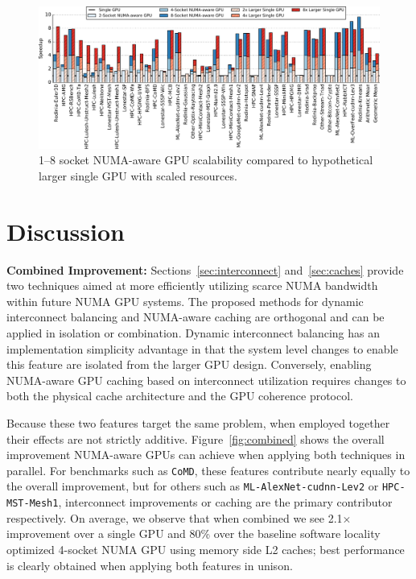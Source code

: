 \begin{figure}[t]
    \centering
    \includegraphics[width=1.0\textwidth]{figures/plot_scalability_mgpu_WB.pdf}
    \vspace{-0.05in}
    \caption{1--8 socket NUMA-aware GPU scalability compared to hypothetical larger single GPU with scaled resources.}
    \label{fig:scalability}
    \vspace{-.2in}
\end{figure}

\vspace{-0.15in}
\section {Discussion}
\label{sec:discussion}
\textbf{Combined Improvement:} Sections~\ref{sec:interconnect} 
and~\ref{sec:caches} provide two techniques aimed at more efficiently utilizing 
scarce NUMA bandwidth within future NUMA GPU systems. The proposed methods
for dynamic interconnect balancing and NUMA-aware caching are orthogonal and 
can be applied in isolation or combination.  Dynamic interconnect balancing 
has an implementation simplicity advantage in that the system level changes to enable 
this feature are isolated from the larger GPU design.  Conversely, enabling 
NUMA-aware GPU caching based on interconnect utilization requires changes to both 
the physical cache architecture and the GPU coherence protocol.

Because these two features target the same problem, when employed 
together their effects are not strictly additive. Figure~\ref{fig:combined} 
shows the overall improvement NUMA-aware GPUs can achieve when applying 
both techniques in parallel.  For benchmarks such as \texttt{CoMD}, these 
features contribute nearly equally to the overall improvement, but for others 
such as \texttt{ML-AlexNet-cudnn-Lev2} or \texttt{HPC-MST-Mesh1}, 
interconnect improvements or caching are the primary contributor 
respectively.  On average, we observe that when combined we see 2.1$\times$ 
improvement over a single GPU and 80\% 
over the baseline software locality optimized 4-socket NUMA GPU 
using memory side L2 caches;  best performance is clearly obtained when
applying both features in unison.

